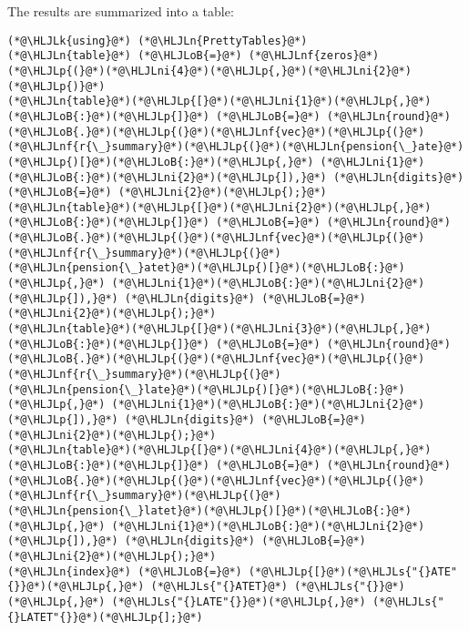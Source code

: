 \documentclass[12pt,a4paper]{article}
\newcommand{\HLJLk}[1]{\textcolor[RGB]{148,91,176}{\textbf{#1}}}
\newcommand{\HLJLn}[1]{#1}
\newcommand{\HLJLnf}[1]{\textcolor[RGB]{66,102,213}{#1}}
\newcommand{\HLJLs}[1]{\textcolor[RGB]{201,61,57}{#1}}
\newcommand{\HLJLni}[1]{\textcolor[RGB]{59,151,46}{#1}}
\newcommand{\HLJLoB}[1]{\textcolor[RGB]{102,102,102}{\textbf{#1}}}
\newcommand{\HLJLp}[1]{#1}
\begin{document}
The results are summarized into a table:


\begin{lstlisting}
(*@\HLJLk{using}@*) (*@\HLJLn{PrettyTables}@*)
(*@\HLJLn{table}@*) (*@\HLJLoB{=}@*) (*@\HLJLnf{zeros}@*)(*@\HLJLp{(}@*)(*@\HLJLni{4}@*)(*@\HLJLp{,}@*)(*@\HLJLni{2}@*)(*@\HLJLp{)}@*)
(*@\HLJLn{table}@*)(*@\HLJLp{[}@*)(*@\HLJLni{1}@*)(*@\HLJLp{,}@*)(*@\HLJLoB{:}@*)(*@\HLJLp{]}@*) (*@\HLJLoB{=}@*) (*@\HLJLn{round}@*)(*@\HLJLoB{.}@*)(*@\HLJLp{(}@*)(*@\HLJLnf{vec}@*)(*@\HLJLp{(}@*)(*@\HLJLnf{r{\_}summary}@*)(*@\HLJLp{(}@*)(*@\HLJLn{pension{\_}ate}@*)(*@\HLJLp{)[}@*)(*@\HLJLoB{:}@*)(*@\HLJLp{,}@*) (*@\HLJLni{1}@*)(*@\HLJLoB{:}@*)(*@\HLJLni{2}@*)(*@\HLJLp{]),}@*) (*@\HLJLn{digits}@*) (*@\HLJLoB{=}@*) (*@\HLJLni{2}@*)(*@\HLJLp{);}@*)
(*@\HLJLn{table}@*)(*@\HLJLp{[}@*)(*@\HLJLni{2}@*)(*@\HLJLp{,}@*)(*@\HLJLoB{:}@*)(*@\HLJLp{]}@*) (*@\HLJLoB{=}@*) (*@\HLJLn{round}@*)(*@\HLJLoB{.}@*)(*@\HLJLp{(}@*)(*@\HLJLnf{vec}@*)(*@\HLJLp{(}@*)(*@\HLJLnf{r{\_}summary}@*)(*@\HLJLp{(}@*)(*@\HLJLn{pension{\_}atet}@*)(*@\HLJLp{)[}@*)(*@\HLJLoB{:}@*)(*@\HLJLp{,}@*) (*@\HLJLni{1}@*)(*@\HLJLoB{:}@*)(*@\HLJLni{2}@*)(*@\HLJLp{]),}@*) (*@\HLJLn{digits}@*) (*@\HLJLoB{=}@*) (*@\HLJLni{2}@*)(*@\HLJLp{);}@*)
(*@\HLJLn{table}@*)(*@\HLJLp{[}@*)(*@\HLJLni{3}@*)(*@\HLJLp{,}@*)(*@\HLJLoB{:}@*)(*@\HLJLp{]}@*) (*@\HLJLoB{=}@*) (*@\HLJLn{round}@*)(*@\HLJLoB{.}@*)(*@\HLJLp{(}@*)(*@\HLJLnf{vec}@*)(*@\HLJLp{(}@*)(*@\HLJLnf{r{\_}summary}@*)(*@\HLJLp{(}@*)(*@\HLJLn{pension{\_}late}@*)(*@\HLJLp{)[}@*)(*@\HLJLoB{:}@*)(*@\HLJLp{,}@*) (*@\HLJLni{1}@*)(*@\HLJLoB{:}@*)(*@\HLJLni{2}@*)(*@\HLJLp{]),}@*) (*@\HLJLn{digits}@*) (*@\HLJLoB{=}@*) (*@\HLJLni{2}@*)(*@\HLJLp{);}@*)
(*@\HLJLn{table}@*)(*@\HLJLp{[}@*)(*@\HLJLni{4}@*)(*@\HLJLp{,}@*)(*@\HLJLoB{:}@*)(*@\HLJLp{]}@*) (*@\HLJLoB{=}@*) (*@\HLJLn{round}@*)(*@\HLJLoB{.}@*)(*@\HLJLp{(}@*)(*@\HLJLnf{vec}@*)(*@\HLJLp{(}@*)(*@\HLJLnf{r{\_}summary}@*)(*@\HLJLp{(}@*)(*@\HLJLn{pension{\_}latet}@*)(*@\HLJLp{)[}@*)(*@\HLJLoB{:}@*)(*@\HLJLp{,}@*) (*@\HLJLni{1}@*)(*@\HLJLoB{:}@*)(*@\HLJLni{2}@*)(*@\HLJLp{]),}@*) (*@\HLJLn{digits}@*) (*@\HLJLoB{=}@*) (*@\HLJLni{2}@*)(*@\HLJLp{);}@*)
(*@\HLJLn{index}@*) (*@\HLJLoB{=}@*) (*@\HLJLp{[}@*)(*@\HLJLs{"{}ATE"{}}@*)(*@\HLJLp{,}@*) (*@\HLJLs{"{}ATET}@*) (*@\HLJLs{"{}}@*)(*@\HLJLp{,}@*) (*@\HLJLs{"{}LATE"{}}@*)(*@\HLJLp{,}@*) (*@\HLJLs{"{}LATET"{}}@*)(*@\HLJLp{];}@*)
\end{lstlisting}
\end{document}
